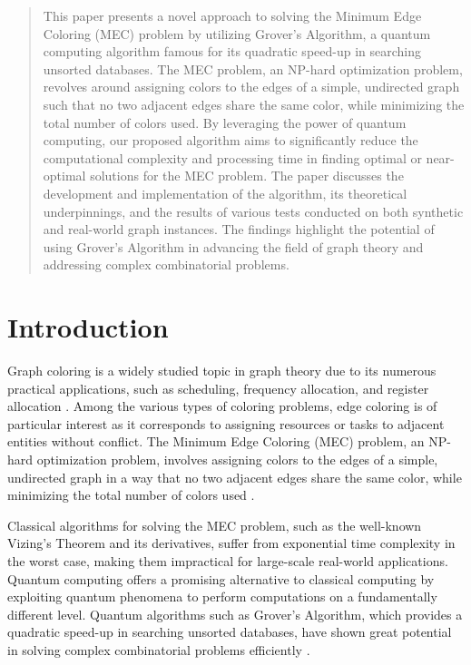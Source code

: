 \begin{abstract}
This paper presents a novel approach to solving the Minimum Edge Coloring (MEC) problem by utilizing Grover's Algorithm, a quantum computing algorithm famous for its quadratic speed-up in searching unsorted databases. The MEC problem, an NP-hard optimization problem, revolves around assigning colors to the edges of a simple, undirected graph such that no two adjacent edges share the same color, while minimizing the total number of colors used. By leveraging the power of quantum computing, our proposed algorithm aims to significantly reduce the computational complexity and processing time in finding optimal or near-optimal solutions for the MEC problem. The paper discusses the development and implementation of the algorithm, its theoretical underpinnings, and the results of various tests conducted on both synthetic and real-world graph instances. The findings highlight the potential of using Grover's Algorithm in advancing the field of graph theory and addressing complex combinatorial problems.
\end{abstract}

\section{Introduction}\label{sec:intro}

Graph coloring is a widely studied topic in graph theory due to its numerous practical applications, such as scheduling, frequency allocation, and register allocation \cite{Jensen2011}. Among the various types of coloring problems, edge coloring is of particular interest as it corresponds to assigning resources or tasks to adjacent entities without conflict. The Minimum Edge Coloring (MEC) problem, an NP-hard optimization problem, involves assigning colors to the edges of a simple, undirected graph in a way that no two adjacent edges share the same color, while minimizing the total number of colors used \cite{Vizing1964}.

Classical algorithms for solving the MEC problem, such as the well-known Vizing's Theorem and its derivatives, suffer from exponential time complexity in the worst case, making them impractical for large-scale real-world applications. Quantum computing offers a promising alternative to classical computing by exploiting quantum phenomena to perform computations on a fundamentally different level. Quantum algorithms such as Grover's Algorithm, which provides a quadratic speed-up in searching unsorted databases, have shown great potential in solving complex combinatorial problems efficiently \cite{Grover1996}.

